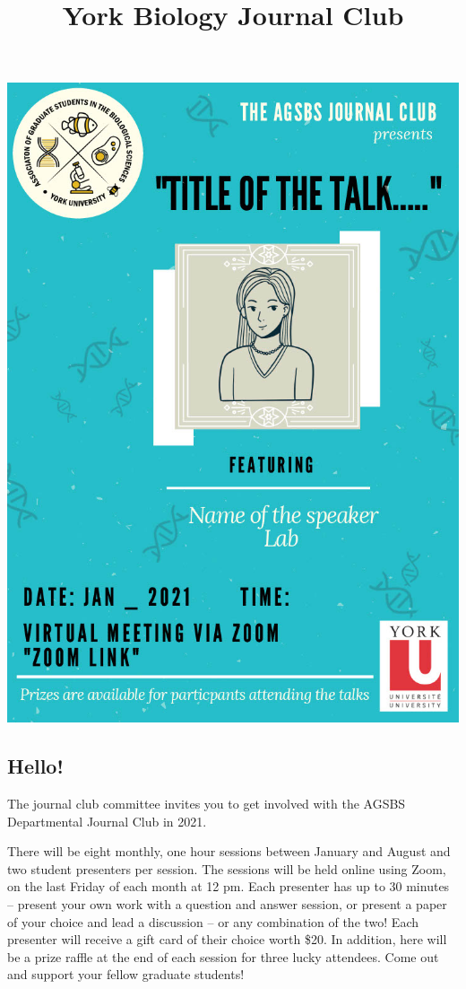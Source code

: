 \documentclass[
]{article}
\title{York Biology Journal Club}
\author{}
\date{\vspace{-2.5em}}
\begin{document}
\maketitle

\includegraphics{template1.jpg}

\hypertarget{hello}{%
\subsection{Hello!}\label{hello}}

The journal club committee invites you to get involved with the AGSBS
Departmental Journal Club in 2021.

There will be eight monthly, one hour sessions between January and
August and two student presenters per session. The sessions will be held
online using Zoom, on the last Friday of each month at 12 pm. Each
presenter has up to 30 minutes -- present your own work with a question
and answer session, or present a paper of your choice and lead a
discussion -- or any combination of the two! Each presenter will receive
a gift card of their choice worth \$20. In addition, here will be a
prize raffle at the end of each session for three lucky attendees. Come
out and support your fellow graduate students!
\end{document}
